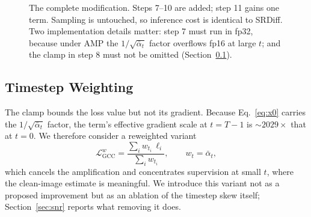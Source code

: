 \documentclass[11pt]{article}
\begin{document}
\begin{figure}[t]
\centering
{}
\caption{The complete modification. Steps 7--10 are added; step 11 gains one
term. Sampling is untouched, so inference cost is identical to SRDiff. Two
implementation details matter: step 7 must run in fp32, because under AMP the
$1/\sqrt{\bar\alpha_t}$ factor overflows fp16 at large $t$; and the clamp in
step 8 must not be omitted (Section~\ref{sec:weighting}).}
\label{fig:algo}
\end{figure}

\subsection{Timestep Weighting}
\label{sec:weighting}

The clamp bounds the loss value but not its gradient. Because
Eq.~\ref{eq:x0} carries the $1/\sqrt{\bar\alpha_t}$ factor, the term's effective
gradient scale at $t{=}T{-}1$ is ${\sim}2029\times$ that at $t{=}0$. We therefore
consider a reweighted variant
\begin{equation}
\mathcal{L}_{\text{GCC}}^{w} = \frac{\sum_i w_{t_i}\,\ell_i}{\sum_i w_{t_i}},
\qquad w_t = \bar\alpha_t ,
\end{equation}
which cancels the amplification and concentrates supervision at small $t$, where
the clean-image estimate is meaningful. We introduce this variant not as a
proposed improvement but as an ablation of the timestep skew itself;
Section~\ref{sec:snr} reports what removing it does.
\end{document}
